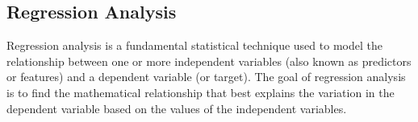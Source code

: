 \documentclass[aps,pra,english,notitlepage,reprint,nofootinbib]{revtex4-1}  %
\begin{document}


\subsection{Regression Analysis}
Regression analysis is a fundamental statistical technique used to model the relationship between one or more independent variables (also known as predictors or features) and a dependent variable (or target). The goal of regression analysis is to find the mathematical relationship that best explains the variation in the dependent variable based on the values of the independent variables.
\end{document}

